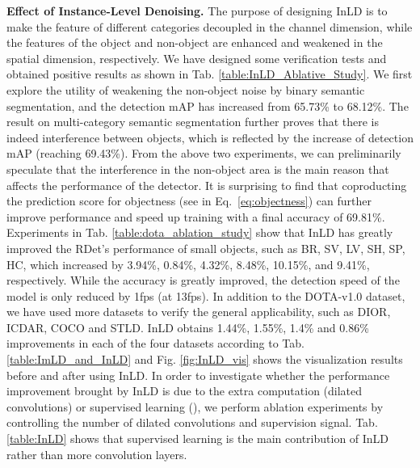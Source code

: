 \documentclass[10pt,journal,compsoc]{IEEEtran}
\begin{document}
\textbf{Effect of Instance-Level Denoising.}
The purpose of designing InLD is to make the feature of different categories decoupled in the channel dimension, while the features of the object and non-object are enhanced and weakened in the spatial dimension, respectively. We have designed some verification tests and obtained positive results as shown in Tab. \ref{table:InLD_Ablative_Study}. We first explore the utility of weakening the non-object noise by binary semantic segmentation, and the detection mAP has increased from 65.73\% to 68.12\%. The result on multi-category semantic segmentation further proves that there is indeed interference between objects, which is reflected by the  increase of detection mAP (reaching 69.43\%). From the above two experiments, we can preliminarily speculate that the interference in the non-object area is the main reason that affects the performance of the detector. It is surprising to find that coproducting the prediction score for objectness (see  in Eq.~\ref{eq:objectness}) can further improve performance and speed up training with a final accuracy of 69.81\%. Experiments in Tab. \ref{table:dota_ablation_study} show that InLD has greatly improved the RDet's performance of small objects, such as BR, SV, LV, SH, SP, HC, which increased by 3.94\%, 0.84\%, 4.32\%, 8.48\%, 10.15\%, and 9.41\%, respectively. While the accuracy is greatly improved, the detection speed of the model is only reduced by 1fps (at 13fps). In addition to the DOTA-v1.0 dataset, we have used more datasets to verify the general applicability, such as DIOR, ICDAR, COCO and STLD. InLD obtains 1.44\%, 1.55\%, 1.4\% and 0.86\% improvements in each of the four datasets according to Tab. \ref{table:ImLD_and_InLD} and Fig. \ref{fig:InLD_vis} shows the visualization results before and after using InLD. In order to investigate whether the performance improvement brought by InLD is due to the extra computation (dilated convolutions) or supervised learning (), we perform ablation experiments by controlling the number of dilated convolutions and supervision signal. Tab. \ref{table:InLD} shows that supervised learning is the main contribution of InLD rather than more convolution layers.
\end{document}
